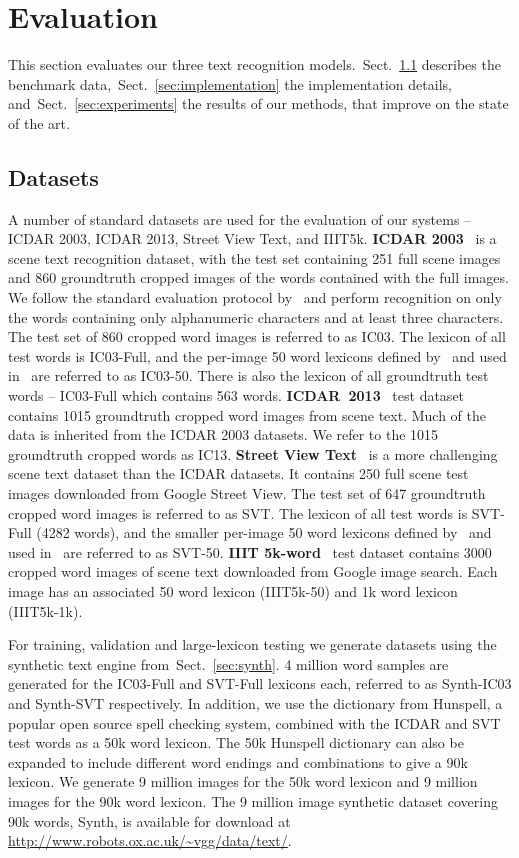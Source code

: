 \documentclass{article} \usepackage{nips14submit_e,times}
\newcommand{\sref}[1]{Sect.~\ref{#1}}
\begin{document}
\section{Evaluation}\label{sec:eval}
This section evaluates our three text recognition models.~\sref{sec:data} describes the benchmark data,~\sref{sec:implementation} the implementation details, and~\sref{sec:experiments} the results of our methods, that improve on the state of the art.


\subsection{Datasets}\label{sec:data}
A number of standard datasets are used for the evaluation of our systems -- ICDAR 2003, ICDAR 2013, Street View Text, and IIIT5k. {\bf ICDAR 2003}~\cite{ICDAR03} is a scene text recognition dataset, with the test set containing 251 full scene images and 860 groundtruth cropped images of the words contained with the full images. We follow the standard evaluation protocol by~\cite{Wang11,Wang12,Alsharif13} and perform recognition on only the words containing only alphanumeric characters and at least three characters. The test set of 860 cropped word images is referred to as IC03. The lexicon of all test words is IC03-Full, and the per-image 50 word lexicons defined by~\cite{Wang11} and used in~\cite{Wang11,Wang12,Alsharif13} are referred to as IC03-50. There is also the lexicon of all groundtruth test words -- IC03-Full which contains 563 words. {\bf ICDAR~2013}~\cite{ICDAR2013} test dataset contains 1015 groundtruth cropped word images from scene text. Much of the data is inherited from the ICDAR 2003 datasets. We refer to the 1015 groundtruth cropped words as IC13. {\bf Street View Text}~\cite{Wang11} is a more challenging scene text dataset than the ICDAR datasets. It contains 250 full scene test images downloaded from Google Street View. The test set of 647 groundtruth cropped word images is referred to as SVT. The lexicon of all test words is SVT-Full (4282 words), and the smaller per-image 50 word lexicons defined by~\cite{Wang11} and used in~\cite{Wang11,Wang12,Alsharif13,Bissacco13} are referred to as SVT-50. {\bf IIIT 5k-word}~\cite{Mishra12} test dataset contains 3000 cropped word images of scene text downloaded from Google image search. Each image has an associated 50 word lexicon (IIIT5k-50) and 1k word lexicon (IIIT5k-1k).

For training, validation and large-lexicon testing we generate datasets using the synthetic text engine from~\sref{sec:synth}. 4 million word samples are generated for the IC03-Full and SVT-Full lexicons each, referred to as Synth-IC03 and Synth-SVT respectively. In addition, we use the dictionary from Hunspell, a popular open source spell checking system, combined with the ICDAR and SVT test words as a 50k word lexicon. The 50k Hunspell dictionary can also be expanded to include different word endings and combinations to give a 90k lexicon. We generate 9 million images for the 50k word lexicon and 9 million images for the 90k word lexicon. The 9 million image synthetic dataset covering 90k words, Synth, is available for download at {\small\url{http://www.robots.ox.ac.uk/~vgg/data/text/}}.
\end{document}
